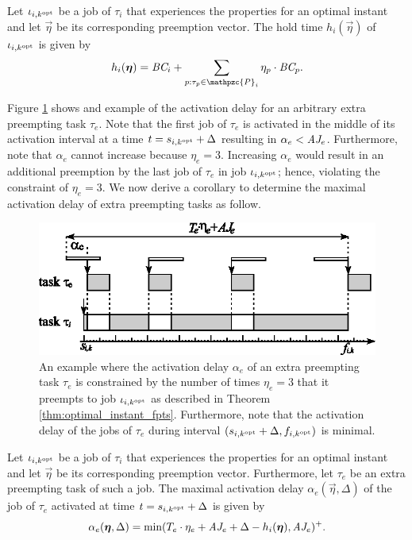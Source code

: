 \begin{corollary}
Let $\iota_{i,k^{\rm{opt}}}$ be a job of $\tau_i$ that experiences the properties for an optimal instant and let $\vec{\eta}$ be its corresponding preemption vector. The hold time $h_i(\vec{\eta})$ of $\iota_{i,k^{\rm{opt}}}$ is given by
\begin{align}
	h_i(\vec{\eta})= \bc_i + \sum\limits_{p:\tau_p \in \mathpzc{P}_i} \eta_p \cdot \bc_p.
\end{align}
\end{corollary}


Figure \ref{fig:alpha_e} shows and example of the activation delay for an arbitrary extra preempting task $\tau_e$. Note that the first job of $\tau_e$ is activated in the middle of its activation interval at a time $t=s_{i,k^{\rm{opt}}}+\Delta$ resulting in $\alpha_e < \mbox{\it AJ}_e$. Furthermore, note that $\alpha_e$ cannot increase because $\eta_e = 3$. Increasing $\alpha_e$ would result in an additional preemption by the last job of $\tau_e$ in job $\iota_{i,k^{\rm{opt}}}$; hence, violating the constraint of $\eta_e = 3$. We now derive a corollary to determine the maximal activation delay of extra preempting tasks as follow.

\begin{figure}[h]
	\centering
	\includegraphics[width=0.7\linewidth]{figures/alpha_e} 
	\caption{An example where the activation delay $\alpha_e$ of an extra preempting task $\tau_e$ is constrained by the number of times $\eta_e = 3$ that it preempts to job $\iota_{i,k^{\rm{opt}}}$ as described in Theorem \ref{thm:optimal_instant_fpts}. Furthermore, note that the activation delay of the jobs of $\tau_e$ during interval $(s_{i,k^{\rm{opt}}} + \Delta,f_{i,k^{\rm{opt}}})$ is minimal.}
	\label{fig:alpha_e}
\end{figure}


\begin{corollary}\label{cor:activation_delay_formula}
	Let $\iota_{i,k^{\rm{opt}}}$ be a job of $\tau_i$ that experiences the properties for an optimal instant and let $\vec{\eta}$ be its corresponding preemption vector. Furthermore, let $\tau_e$ be an extra preempting task of such a job. The maximal activation delay $\alpha_e(\vec{\eta},\Delta)$ of the job of $\tau_e$ activated at time $t = s_{i,k^{\rm{opt}}}+\Delta$ is given by
	\begin{align} \label{eqn:alpha_e}
		\alpha_e(\vec{\eta},\Delta) = \min(T_e \cdot \eta_e + \aj_e + \Delta - h_i(\vec{\eta}), \aj_e)^+.
	\end{align}
\end{corollary}

